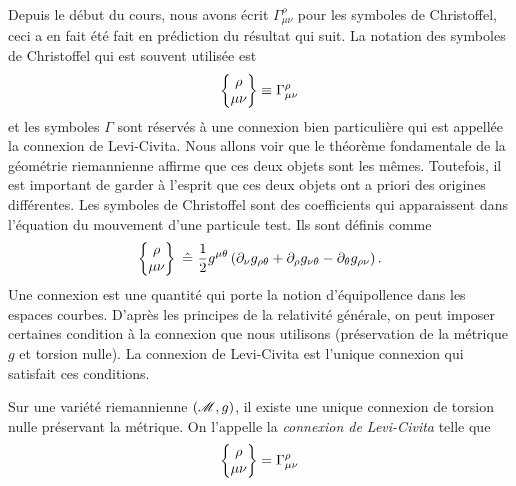 \documentclass[a4paper,11pt]{report}
\begin{document}
                Depuis le début du cours, nous avons écrit $\Gamma^\rho_{\mu\nu}$ pour les symboles de Christoffel, ceci  a en fait été fait en prédiction du résultat qui suit. La notation des symboles de Christoffel qui est souvent utilisée est
                \begin{equation*}
                    \begin{Bmatrix}\rho\\\mu\nu\end{Bmatrix}\equiv
                    \Gamma^\rho_{\mu\nu}
                \end{equation*}
                et les symboles $\Gamma$ sont réservés à une connexion bien particulière qui est appellée la connexion de Levi-Civita. Nous allons voir que le théorème fondamentale de la géométrie riemannienne affirme que ces deux objets sont les mêmes. Toutefois, il est important de garder à l'esprit que ces deux objets ont a priori des origines différentes. Les symboles de Christoffel sont des coefficients qui apparaissent dans l'équation du mouvement d'une particule test. Ils sont définis comme
                \begin{equation}
                    \begin{Bmatrix}\rho\\\mu\nu\end{Bmatrix}~\hat{=}~
                    \frac{1}{2}g^{\mu\theta}\left( \partial_\nu g_{\rho\theta}+\partial_\rho g_{\nu\theta}-\partial_\theta g_{\rho\nu} \right).
                \end{equation}
                Une connexion est une quantité qui porte la notion d'équipollence dans les espaces courbes. D'après les principes de la relativité générale, on peut imposer certaines condition à la connexion que nous utilisons (préservation de la métrique $g$ et torsion nulle). La connexion de Levi-Civita est l'unique connexion qui satisfait ces conditions.\\
            
                \begin{thm}\begin{leftbar}
                    Sur une variété riemannienne $(\mathscr{M},g)$, il existe une unique connexion de torsion nulle préservant la métrique. On l'appelle la \textit{connexion de Levi-Civita} telle que
                    \begin{equation}
                        \begin{Bmatrix}\rho\\\mu\nu\end{Bmatrix}=\Gamma^\rho_{\mu\nu}
                    \end{equation}
                \end{leftbar}\end{thm}
                
\end{document}
